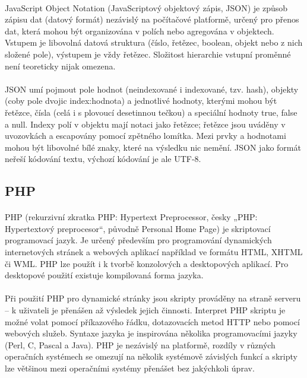 \paragraph{}
JavaScript Object Notation (JavaScriptový objektový zápis, JSON) je způsob zápisu dat (datový formát) nezávislý na počítačové platformě, určený pro přenos dat, která mohou být organizována v polích nebo agregována v objektech. Vstupem je libovolná datová struktura (číslo, řetězec, boolean, objekt nebo z nich složené pole), výstupem je vždy řetězec. Složitost hierarchie vstupní proměnné není teoreticky nijak omezena.
\paragraph{}
JSON umí pojmout pole hodnot (neindexované i indexované, tzv. hash), objekty (coby pole dvojic index:hodnota) a jednotlivé hodnoty, kterými mohou být řetězce, čísla (celá i s plovoucí desetinnou tečkou) a speciální hodnoty true, false a null. Indexy polí v objektu mají notaci jako řetězce; řetězce jsou uváděny v uvozovkách a escapovány pomocí zpětného lomítka. Mezi prvky a hodnotami mohou být libovolné bílé znaky, které na výsledku nic nemění. JSON jako formát neřeší kódování textu, výchozí kódování je ale UTF-8.



\subsection{PHP}
\paragraph{}
PHP (rekurzivní zkratka PHP: Hypertext Preprocessor, česky „PHP: Hypertextový preprocesor“, původně Personal Home Page) je skriptovací programovací jazyk. Je určený především pro programování dynamických internetových stránek a webových aplikací například ve formátu HTML, XHTML či WML. PHP lze použít i k tvorbě konzolových a desktopových aplikací. Pro desktopové použití existuje kompilovaná forma jazyka.
\paragraph{}
Při použití PHP pro dynamické stránky jsou skripty prováděny na straně serveru – k uživateli je přenášen až výsledek jejich činnosti. Interpret PHP skriptu je možné volat pomocí příkazového řádku, dotazovacích metod HTTP nebo pomocí webových služeb. Syntaxe jazyka je inspirována několika programovacími jazyky (Perl, C, Pascal a Java). PHP je nezávislý na platformě, rozdíly v různých operačních systémech se omezují na několik systémově závislých funkcí a skripty lze většinou mezi operačními systémy přenášet bez jakýchkoli úprav.
